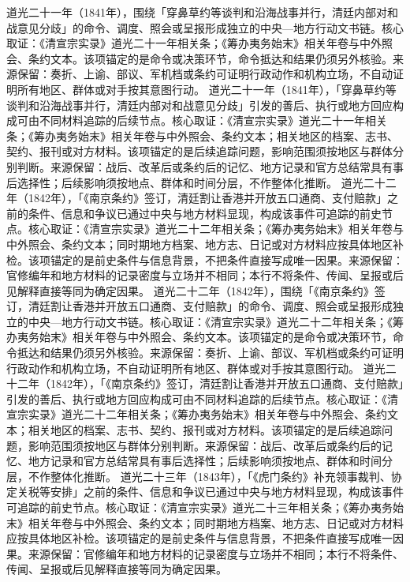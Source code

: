 道光二十一年（1841年），围绕「穿鼻草约等谈判和沿海战事并行，清廷内部对和战意见分歧」的命令、调度、照会或呈报形成独立的中央—地方行动文书链。核心取证：《清宣宗实录》道光二十一年相关条；《筹办夷务始末》相关年卷与中外照会、条约文本。该项锚定的是命令或决策环节，命令抵达和结果仍须另外核验。来源保留：奏折、上谕、部议、军机档或条约可证明行政动作和机构立场，不自动证明所有地区、群体或对手按其意图行动。
道光二十一年（1841年），「穿鼻草约等谈判和沿海战事并行，清廷内部对和战意见分歧」引发的善后、执行或地方回应构成可由不同材料追踪的后续节点。核心取证：《清宣宗实录》道光二十一年相关条；《筹办夷务始末》相关年卷与中外照会、条约文本；相关地区的档案、志书、契约、报刊或对方材料。该项锚定的是后续追踪问题，影响范围须按地区与群体分别判断。来源保留：战后、改革后或条约后的记忆、地方记录和官方总结常具有事后选择性；后续影响须按地点、群体和时间分层，不作整体化推断。
道光二十二年（1842年），「《南京条约》签订，清廷割让香港并开放五口通商、支付赔款」之前的条件、信息和争议已通过中央与地方材料显现，构成该事件可追踪的前史节点。核心取证：《清宣宗实录》道光二十二年相关条；《筹办夷务始末》相关年卷与中外照会、条约文本；同时期地方档案、地方志、日记或对方材料应按具体地区补检。该项锚定的是前史条件与信息背景，不把条件直接写成唯一因果。来源保留：官修编年和地方材料的记录密度与立场并不相同；本行不将条件、传闻、呈报或后见解释直接等同为确定因果。
道光二十二年（1842年），围绕「《南京条约》签订，清廷割让香港并开放五口通商、支付赔款」的命令、调度、照会或呈报形成独立的中央—地方行动文书链。核心取证：《清宣宗实录》道光二十二年相关条；《筹办夷务始末》相关年卷与中外照会、条约文本。该项锚定的是命令或决策环节，命令抵达和结果仍须另外核验。来源保留：奏折、上谕、部议、军机档或条约可证明行政动作和机构立场，不自动证明所有地区、群体或对手按其意图行动。
道光二十二年（1842年），「《南京条约》签订，清廷割让香港并开放五口通商、支付赔款」引发的善后、执行或地方回应构成可由不同材料追踪的后续节点。核心取证：《清宣宗实录》道光二十二年相关条；《筹办夷务始末》相关年卷与中外照会、条约文本；相关地区的档案、志书、契约、报刊或对方材料。该项锚定的是后续追踪问题，影响范围须按地区与群体分别判断。来源保留：战后、改革后或条约后的记忆、地方记录和官方总结常具有事后选择性；后续影响须按地点、群体和时间分层，不作整体化推断。
道光二十三年（1843年），「《虎门条约》补充领事裁判、协定关税等安排」之前的条件、信息和争议已通过中央与地方材料显现，构成该事件可追踪的前史节点。核心取证：《清宣宗实录》道光二十三年相关条；《筹办夷务始末》相关年卷与中外照会、条约文本；同时期地方档案、地方志、日记或对方材料应按具体地区补检。该项锚定的是前史条件与信息背景，不把条件直接写成唯一因果。来源保留：官修编年和地方材料的记录密度与立场并不相同；本行不将条件、传闻、呈报或后见解释直接等同为确定因果。
